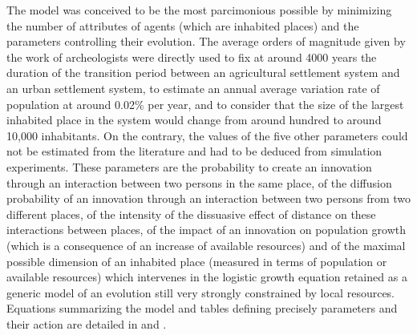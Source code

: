 \documentclass[10pt]{article}
\begin{document}
The model was conceived to be the most parcimonious possible by minimizing the number of attributes of agents (which are inhabited places) and the parameters controlling their evolution. The average orders of magnitude given by the work of archeologists were directly used to fix at around 4000 years the duration of the transition period between an agricultural settlement system and an urban settlement system, to estimate an annual average variation rate of population at around 0.02\% per year, and to consider that the size of the largest inhabited place in the system would change from around hundred to around 10,000 inhabitants. On the contrary, the values of the five other parameters could not be estimated from the literature and had to be deduced from simulation experiments. These parameters are the probability to create an innovation through an interaction between two persons in the same place, of the diffusion probability of an innovation through an interaction between two persons from two different places, of the intensity of the dissuasive effect of distance on these interactions between places, of the impact of an innovation on population growth (which is a consequence of an increase of available resources) and of the maximal possible dimension of an inhabited place (measured in terms of population or available resources) which intervenes in the logistic growth equation retained as a generic model of an evolution still very strongly constrained by local resources. Equations summarizing the model and tables defining precisely parameters and their action are detailed in \cite{schmitt2014modelisation} and \cite{}.
\end{document}
